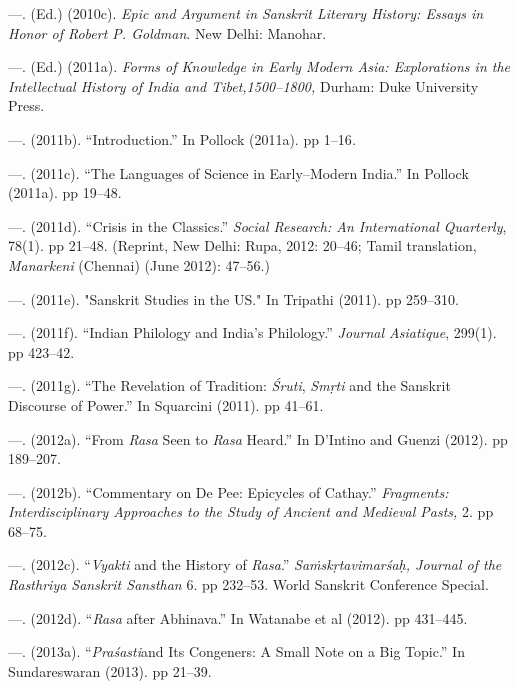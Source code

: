\begin{thebibliography}{99}
 \item —. (Ed.) (2010c). \textit{Epic and Argument in Sanskrit Literary History: Essays in Honor of Robert P. Goldman}. New Delhi: Manohar.

 \item —. (Ed.) (2011a). \textit{Forms of Knowledge in Early Modern Asia: Explorations in the Intellectual History of India and Tibet,1500–1800, }Durham: Duke University Press.

 \item —. (2011b). “Introduction.” In Pollock (2011a). pp 1–16\textit{.}

 \item —. (2011c). “The Languages of Science in Early–Modern India.” In Pollock (2011a). pp 19–48.

 \item —. (2011d). “Crisis in the Classics.” \textit{ Social Research: An International Quarterly}, 78(1). pp 21–48. (Reprint, New Delhi: Rupa, 2012: 20–46; Tamil translation, \textit{Manarkeni} (Chennai) (June 2012): 47–56.)

 \item —. (2011e). "Sanskrit Studies in the US." In Tripathi (2011). pp 259–310. 

 \item —. (2011f). “Indian Philology and India’s Philology.” \textit{Journal Asiatique}, 299(1). pp 423–42.

 \item —. (2011g). “The Revelation of Tradition: \textit{Śruti}, \textit{Smṛti} and the Sanskrit Discourse of Power.” In Squarcini (2011). pp 41–61.

 \item —. (2012a). “From \textit{Rasa} Seen to \textit{Rasa} Heard.” In D’Intino and Guenzi (2012). pp 189–207.

 \item —. (2012b). “Commentary on De Pee: Epicycles of Cathay.” \textit{Fragments: Interdisciplinary Approaches to the Study of Ancient and Medieval Pasts,} 2. pp 68–75.

 \item —. (2012c). “\textit{Vyakti} and the History of \textit{Rasa}.” \textit{Saṁskṛtavimarśaḥ, Journal of the Rasthriya Sanskrit Sansthan} 6. pp 232–53. World Sanskrit Conference Special.

 \item —. (2012d). “\textit{Rasa} after Abhinava.” In Watanabe et al (2012). pp 431–445.

 \item —. (2013a). “\textit{Praśasti}and Its Congeners: A Small Note on a Big Topic.” In Sundareswaran (2013). pp 21–39.


\end{thebibliography}
